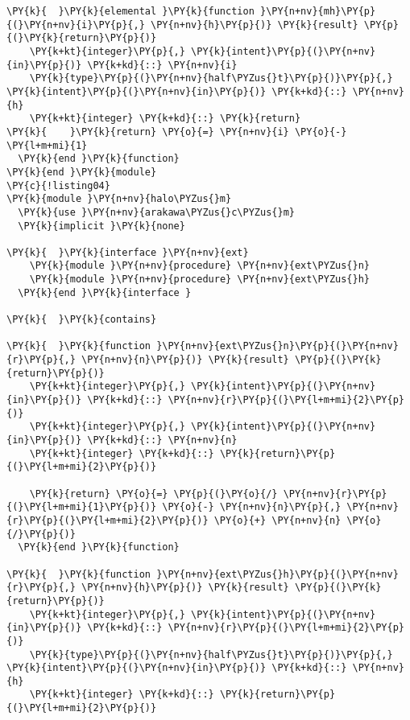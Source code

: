\begin{Verbatim}[commandchars=\\\{\}]
\PY{k}{  }\PY{k}{elemental }\PY{k}{function }\PY{n+nv}{mh}\PY{p}{(}\PY{n+nv}{i}\PY{p}{,} \PY{n+nv}{h}\PY{p}{)} \PY{k}{result} \PY{p}{(}\PY{k}{return}\PY{p}{)}
    \PY{k+kt}{integer}\PY{p}{,} \PY{k}{intent}\PY{p}{(}\PY{n+nv}{in}\PY{p}{)} \PY{k+kd}{::} \PY{n+nv}{i} 
    \PY{k}{type}\PY{p}{(}\PY{n+nv}{half\PYZus{}t}\PY{p}{)}\PY{p}{,} \PY{k}{intent}\PY{p}{(}\PY{n+nv}{in}\PY{p}{)} \PY{k+kd}{::} \PY{n+nv}{h}
    \PY{k+kt}{integer} \PY{k+kd}{::} \PY{k}{return}
\PY{k}{    }\PY{k}{return} \PY{o}{=} \PY{n+nv}{i} \PY{o}{-} \PY{l+m+mi}{1}
  \PY{k}{end }\PY{k}{function}
\PY{k}{end }\PY{k}{module}
\PY{c}{!listing04}
\PY{k}{module }\PY{n+nv}{halo\PYZus{}m}
  \PY{k}{use }\PY{n+nv}{arakawa\PYZus{}c\PYZus{}m}
  \PY{k}{implicit }\PY{k}{none}

\PY{k}{  }\PY{k}{interface }\PY{n+nv}{ext}
    \PY{k}{module }\PY{n+nv}{procedure} \PY{n+nv}{ext\PYZus{}n}
    \PY{k}{module }\PY{n+nv}{procedure} \PY{n+nv}{ext\PYZus{}h}
  \PY{k}{end }\PY{k}{interface }

\PY{k}{  }\PY{k}{contains}

\PY{k}{  }\PY{k}{function }\PY{n+nv}{ext\PYZus{}n}\PY{p}{(}\PY{n+nv}{r}\PY{p}{,} \PY{n+nv}{n}\PY{p}{)} \PY{k}{result} \PY{p}{(}\PY{k}{return}\PY{p}{)}
    \PY{k+kt}{integer}\PY{p}{,} \PY{k}{intent}\PY{p}{(}\PY{n+nv}{in}\PY{p}{)} \PY{k+kd}{::} \PY{n+nv}{r}\PY{p}{(}\PY{l+m+mi}{2}\PY{p}{)}
    \PY{k+kt}{integer}\PY{p}{,} \PY{k}{intent}\PY{p}{(}\PY{n+nv}{in}\PY{p}{)} \PY{k+kd}{::} \PY{n+nv}{n}
    \PY{k+kt}{integer} \PY{k+kd}{::} \PY{k}{return}\PY{p}{(}\PY{l+m+mi}{2}\PY{p}{)}
    
    \PY{k}{return} \PY{o}{=} \PY{p}{(}\PY{o}{/} \PY{n+nv}{r}\PY{p}{(}\PY{l+m+mi}{1}\PY{p}{)} \PY{o}{-} \PY{n+nv}{n}\PY{p}{,} \PY{n+nv}{r}\PY{p}{(}\PY{l+m+mi}{2}\PY{p}{)} \PY{o}{+} \PY{n+nv}{n} \PY{o}{/}\PY{p}{)}
  \PY{k}{end }\PY{k}{function}

\PY{k}{  }\PY{k}{function }\PY{n+nv}{ext\PYZus{}h}\PY{p}{(}\PY{n+nv}{r}\PY{p}{,} \PY{n+nv}{h}\PY{p}{)} \PY{k}{result} \PY{p}{(}\PY{k}{return}\PY{p}{)}
    \PY{k+kt}{integer}\PY{p}{,} \PY{k}{intent}\PY{p}{(}\PY{n+nv}{in}\PY{p}{)} \PY{k+kd}{::} \PY{n+nv}{r}\PY{p}{(}\PY{l+m+mi}{2}\PY{p}{)}
    \PY{k}{type}\PY{p}{(}\PY{n+nv}{half\PYZus{}t}\PY{p}{)}\PY{p}{,} \PY{k}{intent}\PY{p}{(}\PY{n+nv}{in}\PY{p}{)} \PY{k+kd}{::} \PY{n+nv}{h}
    \PY{k+kt}{integer} \PY{k+kd}{::} \PY{k}{return}\PY{p}{(}\PY{l+m+mi}{2}\PY{p}{)}
    

\end{Verbatim}
